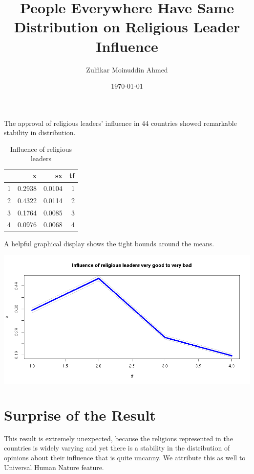 \documentclass{amsart}
\title{People Everywhere Have Same Distribution on Religious Leader Influence}
\author{Zulfikar Moinuddin Ahmed}
\date{\today}
\begin{document}
\maketitle

The approval of religious leaders' influence in 44 countries showed remarkable stability in distribution.

\begin{table}[ht]
\centering
\begin{tabular}{rrrr}
  \hline
 & x & sx & tf \\ 
  \hline
1 & 0.2938 & 0.0104 &  1 \\ 
  2 & 0.4322 & 0.0114 &  2 \\ 
  3 & 0.1764 & 0.0085 &  3 \\ 
  4 & 0.0976 & 0.0068 &  4 \\ 
   \hline
\end{tabular}
\caption{Influence of religious leaders} 
\end{table}

A helpful graphical display shows the tight bounds around the means.

\includegraphics[scale=0.5]{relop.png}

\section{Surprise of the Result}

This result is extremely unexpected, because the religions represented in the countries is widely varying and yet there is a stability in the distribution of opinions about their influence that is quite uncanny.  We attribute this as well to Universal Human Nature feature.
\end{document}
